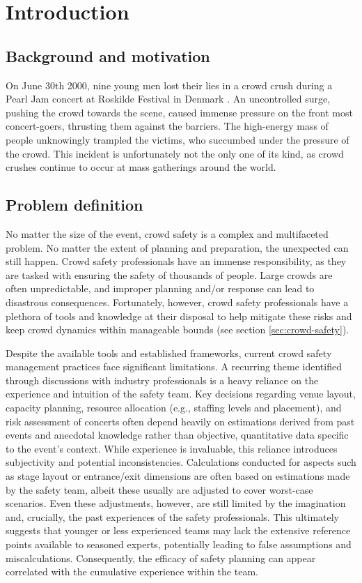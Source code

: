 \chapter{Introduction}

\section{Background and motivation}
On June 30th 2000, nine young men lost their lies in a crowd crush during a Pearl Jam concert at Roskilde Festival in Denmark \cite{pearl_jam}. An uncontrolled surge, pushing the crowd towards the scene, caused immense pressure on the front most concert-goers, thrusting them against the barriers. The high-energy mass of people unknowingly trampled the victims, who succumbed under the pressure of the crowd. This incident is unfortunately not the only one of its kind, as crowd crushes continue to occur at mass gatherings around the world.

\section{Problem definition}
\label{sec:problem-definition}

No matter the size of the event, crowd safety is a complex and multifaceted problem. No matter the extent of planning and preparation, the unexpected can still happen. Crowd safety professionals have an immense responsibility, as they are tasked with ensuring the safety of thousands of people. Large crowds are often unpredictable, and improper planning and/or response can lead to disastrous consequences. Fortunately, however, crowd safety professionals have a plethora of tools and knowledge at their disposal to help mitigate these risks and keep crowd dynamics within manageable bounds (see section \ref{sec:crowd-safety}).

Despite the available tools and established frameworks, current crowd safety management practices face significant limitations. A recurring theme identified through discussions with industry professionals is a heavy reliance on the experience and intuition of the safety team. Key decisions regarding venue layout, capacity planning, resource allocation (e.g., staffing levels and placement), and risk assessment of concerts often depend heavily on estimations derived from past events and anecdotal knowledge rather than objective, quantitative data specific to the event's context. While experience is invaluable, this reliance introduces subjectivity and potential inconsistencies. Calculations conducted for aspects such as stage layout or entrance/exit dimensions are often based on estimations made by the safety team, albeit these usually are adjusted to cover worst-case scenarios. Even these adjustments, however, are still limited by the imagination and, crucially, the past experiences of the safety professionals. This ultimately suggests that younger or less experienced teams may lack the extensive reference points available to seasoned experts, potentially leading to false assumptions and miscalculations. Consequently, the efficacy of safety planning can appear correlated with the cumulative experience within the team.


